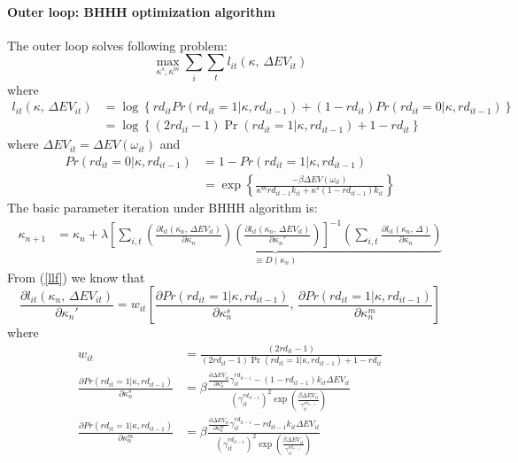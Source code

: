 \documentclass[11pt]{article}
\begin{document}
\paragraph{Outer loop: BHHH optimization algorithm}

The outer loop solves following problem:
\[
\max_{\kappa^{s},\kappa^{m}}\sum_{i}\sum_{t}l_{it}\left(\kappa,\,\Delta EV_{it}\right)
\]
 where 
\begin{align}
l_{it}\left(\kappa,\,\Delta EV_{it}\right) & =\log\left\{ rd_{it}Pr\left(rd_{it}=1|\kappa,rd_{it-1}\right)+\left(1-rd_{it}\right)Pr\left(rd_{it}=0|\kappa,rd_{it-1}\right)\right\} \label{llf}\\
 & =\log\left\{ \left(2rd_{it}-1\right)\Pr\left(rd_{it}=1|\kappa,rd_{it-1}\right)+1-rd_{it}\right\} \nonumber 
\end{align}
where $\Delta EV_{it}=\Delta EV\left(\omega_{it}\right)$ and 
\begin{align}
Pr\left(rd_{it}=0|\kappa,rd_{it-1}\right) & =1-Pr\left(rd_{it}=1|\kappa,rd_{it-1}\right)\\
 & =\exp\left\{ \frac{-\beta\Delta EV\left(\omega_{it}\right)}{\kappa^{m}rd_{it-1}k_{it}+\kappa^{s}\left(1-rd_{it-1}\right)k_{it}}\right\} \nonumber 
\end{align}
The basic parameter iteration under BHHH algorithm is:
\begin{align*}
\kappa_{n+1} & =\kappa_{n}+\lambda\underset{\equiv D\left(\kappa_{n}\right)}{\underbrace{\left[\sum_{i,t}\left(\frac{\partial l_{it}\left(\kappa_{n},\,\Delta EV_{it}\right)}{\partial\kappa_{n}}\right)\left(\frac{\partial l_{it}\left(\kappa_{n},\,\Delta EV_{it}\right)}{\partial\kappa_{n}'}\right)\right]^{-1}\left(\sum_{i,t}\frac{\partial l_{it}\left(\kappa_{n},\,\Delta\right)}{\partial\kappa_{n}}\right)}}
\end{align*}
From (\ref{llf}) we know that 
\begin{equation}
\frac{\partial l_{it}\left(\kappa_{n},\,\Delta EV_{it}\right)}{\partial\kappa_{n}'}=w_{it}\left[\frac{\partial Pr\left(rd_{it}=1|\kappa,rd_{it-1}\right)}{\partial\kappa_{n}^{s}},\,\frac{\partial Pr\left(rd_{it}=1|\kappa,rd_{it-1}\right)}{\partial\kappa_{n}^{m}}\right]
\end{equation}
where
\begin{align*}
w_{it} & =\frac{\left(2rd_{it}-1\right)}{\left(2rd_{it}-1\right)\Pr\left(rd_{it}=1|\kappa,rd_{it-1}\right)+1-rd_{it}}\\
\frac{\partial Pr\left(rd_{it}=1|\kappa,rd_{it-1}\right)}{\partial\kappa_{n}^{s}} & =\beta\frac{\frac{\partial\Delta EV_{it}}{\partial\kappa_{n}^{s}}\gamma_{it}^{rd_{it-1}}-\left(1-rd_{it-1}\right)k_{it}\Delta EV_{it}}{\left(\gamma_{it}^{rd_{it-1}}\right)^{2}\exp\left(\frac{\beta\Delta EV_{it}}{\gamma_{it}^{rd_{it-1}}}\right)}\\
\frac{\partial Pr\left(rd_{it}=1|\kappa,rd_{it-1}\right)}{\partial\kappa_{n}^{m}} & =\beta\frac{\frac{\partial\Delta EV_{it}}{\partial\kappa_{n}^{m}}\gamma_{it}^{rd_{it-1}}-rd_{it-1}k_{it}\Delta EV_{it}}{\left(\gamma_{it}^{rd_{it-1}}\right)^{2}\exp\left(\frac{\beta\Delta EV_{it}}{\gamma_{it}^{rd_{it-1}}}\right)}
\end{align*}
\end{document}
